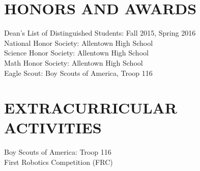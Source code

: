\documentclass{res}
\begin{document}
\begin{resume}
\section{HONORS AND AWARDS}          
    Dean's List of Distinguished Students: Fall 2015, Spring 2016  \\        
    National Honor Society: Allentown High School  \\        
    Science Honor Society: Allentown High School  \\       
    Math Honor Society: Allentown High School\\ 
    Eagle Scout: Boy Scouts of America, Troop 116
\vspace{-0.2in}
\section{EXTRACURRICULAR ACTIVITIES}          
    Boy Scouts of America: Troop 116 \\
    First Robotics Competition (FRC)
\end{resume}
\end{document}

